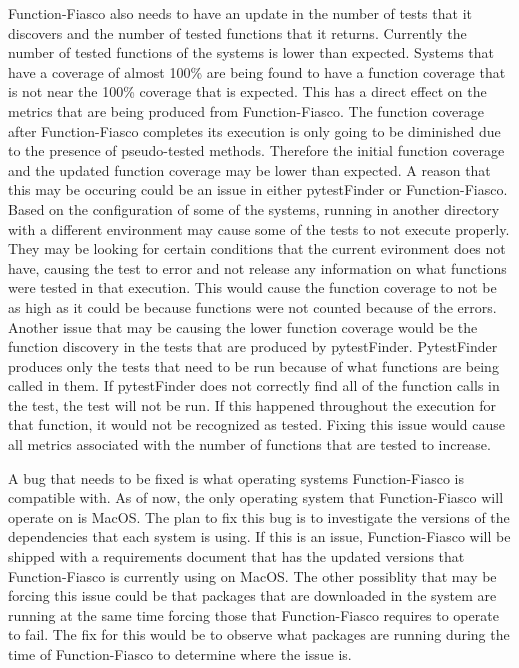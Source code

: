 Function-Fiasco also needs to have an update in the number of tests that it discovers and the number of tested functions that it returns. Currently the number of tested functions of the systems is lower than expected. Systems that have a coverage of almost 100\% are being found to have a function coverage that is not near the 100\% coverage that is expected. This has a direct effect on the metrics that are being produced from Function-Fiasco. The function coverage after Function-Fiasco completes its execution is only going to be diminished due to the presence of pseudo-tested methods. Therefore the initial function coverage and the updated function coverage may be lower than expected. A reason that this may be occuring could be an issue in either pytestFinder or Function-Fiasco. Based on the configuration of some of the systems, running in another directory with a different environment may cause some of the tests to not execute properly. They may be looking for certain conditions that the current evironment does not have, causing the test to error and not release any information on what functions were tested in that execution. This would cause the function coverage to not be as high as it could be because functions were not counted because of the errors. Another issue that may be causing the lower function coverage would be the function discovery in the tests that are produced by pytestFinder. PytestFinder produces only the tests that need to be run because of what functions are being called in them. If pytestFinder does not correctly find all of the function calls in the test, the test will not be run. If this happened throughout the execution for that function, it would not be recognized as tested. Fixing this issue would cause all metrics associated with the number of functions that are tested to increase.

  A bug that needs to be fixed is what operating systems Function-Fiasco is compatible with. As of now, the only operating system that Function-Fiasco will operate on is MacOS. The plan to fix this bug is to investigate the versions of the dependencies that each system is using. If this is an issue, Function-Fiasco will be shipped with a requirements document that has the updated versions that Function-Fiasco is currently using on MacOS. The other possiblity that may be forcing this issue could be that packages that are downloaded in the system are running at the same time forcing those that Function-Fiasco requires to operate to fail. The fix for this would be to observe what packages are running during the time of Function-Fiasco to determine where the issue is.

